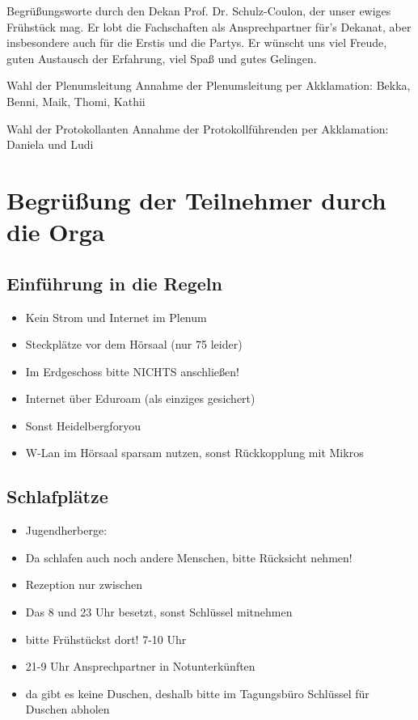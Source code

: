 
Begrüßungsworte durch den Dekan Prof. Dr. Schulz-Coulon, der unser ewiges Frühstück mag. Er lobt die Fachschaften als Ansprechpartner für's Dekanat, aber insbesondere auch für die Erstis und die Partys. Er wünscht uns viel Freude, guten Austausch der Erfahrung, viel Spaß und gutes Gelingen.

\begin{success}{Wahl der Plenumsleitung}
  Annahme der Plenumsleitung per Akklamation: Bekka, Benni, Maik, Thomi, Kathii
\end{success}

\begin{success}{Wahl der Protokollanten}
  Annahme der Protokollführenden per Akklamation: Daniela und Ludi
\end{success}

\section{Begrüßung der Teilnehmer durch die Orga}
  \subsection*{Einführung in die Regeln}
    \begin{itemize}
      \item Kein Strom und Internet im Plenum
      \item Steckplätze vor dem Hörsaal (nur 75 leider)
      \item Im Erdgeschoss bitte NICHTS anschließen!
      \item Internet über Eduroam (als einziges gesichert)
      \item Sonst Heidelbergforyou
      \item W-Lan im Hörsaal sparsam nutzen, sonst Rückkopplung mit Mikros
    \end{itemize}

  \subsection*{Schlafplätze}
    \begin{itemize}
      \item Jugendherberge:
      \item Da schlafen auch noch andere Menschen, bitte Rücksicht nehmen!
      \item Rezeption nur zwischen
      \item Das  8 und 23 Uhr besetzt, sonst Schlüssel mitnehmen
      \item bitte Frühstückst dort! 7-10 Uhr
      \item 21-9 Uhr Ansprechpartner in Notunterkünften
      \item da gibt es keine Duschen, deshalb bitte im Tagungsbüro Schlüssel für Duschen abholen
    \end{itemize}

